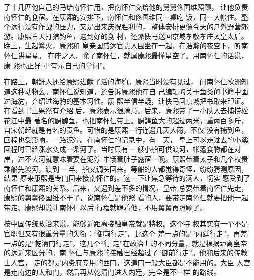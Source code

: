 了十几匹他自己的马给南怀仁用，把南怀仁交给他的舅舅佟国维照顾，%
让他负责南怀仁的食宿。在康熙的安排下，南怀仁和佟国维同一桌吃%
饭，同一大帐住。整个远行没有作战的压力，又是出来庆祝胜利的，%
整体安排更像今天的户外野营郊游。康熙白天打猎钓鱼，遇到好的食%
材，还派快马送回京城孝敬孝庄太皇太后。晚上，生起篝火，康熙和%
皇亲国戚达官贵人围坐在一起，在浩瀚的夜空下，听南怀仁讲星星。%
在座之人，除了南怀仁，就属康熙最懂星空了。用南怀仁的话说，康%
熙也正好可“夸示自己的学问”。%
\par
在路上，朝鲜人还给康熙进献了活的海豹。康熙当时没有见过，%
问南怀仁欧洲知道这种动物么。南怀仁说知道，还告诉康熙他在自%
己编辑的关于鱼类的书籍中画过海豹，介绍过海豹的基本习性。康%
熙半信半疑，让快马回京城把书取来印证。在看到书上果然有介绍%
后，康熙表示很满意。后来，康熙带了一小队人去捕捞松花江中最%
著名的鲟鳇鱼，也把南怀仁带上。鲟鳇鱼大的超过两米，重两百多斤，%
自宋朝起就是有名的贡鱼。可惜的是康熙一行连遇几天大雨，不仅%
没有捕到鱼，回程也受影响，一路泥泞。在南怀仁的记录中，有一天，%
早上可以走过去的小溪回程时已经涨水变成一条河了。当时只有一%
艘小船可供渡河，帐篷食物都在对岸，过不去河就意味着要在泥泞%
中饿着肚子露宿一晚。康熙带着太子和几个权贵乘船先渡河，渡到%
一半，船又调头回来。等船的人都觉得奇怪，纷纷猜测原因，结果%
原来康熙是专门回来接南怀仁的。这一下让焦急等待的满人，切实%
感受到了南怀仁和康熙的关系。后来，又遇到差不多的情况，皇帝%
总要带着南怀仁先走，康熙的舅舅佟国维不干了，说南怀仁是他照%
看的人，要带走南怀仁就要把他一起带走。康熙却说让南怀仁以后%
行程就跟着他，不用舅舅再照顾了。%
\par
按中国传统政治来说，能够近距离接触皇帝就是特权。这个特%
权其实有一个不是官职但又有很重分量的头衔：“御前行走”。比这个%
差一点的是“内廷行走”，再差一点的是“乾清门行走”。这几个“行%
走”在政治上的不同分量，就是根据距离皇帝的远近来区分的。南%
怀仁与康熙的接触已经超过了“御前行走”。他和后来的传教士人宫，%
走的都是内务府专用的西门，这道门一般大臣都是不能用的。大臣%
人宫是走南边的太和门，然后再从乾清门进人内廷，完全是不一样%
的路线。%
